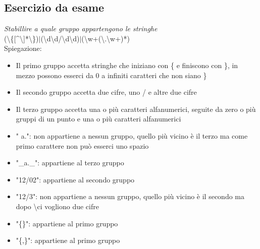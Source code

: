 \documentclass[12pt]{article}
\begin{document}
\subsection{Esercizio da esame}
\textit{Stabillire a quale gruppo appartengono le stringhe}\\
(\textbackslash \{[\textasciicircum\textbackslash]*\textbackslash\})$|$(\textbackslash d\textbackslash d/\textbackslash d\textbackslash d)$|$(\textbackslash w+(\textbackslash.\textbackslash w+)*)\\
Spiegazione:
\begin{itemize}
    \item Il primo gruppo accetta stringhe che iniziano con \{ e finiscono con \}, in mezzo possono esserci da 0 a infiniti caratteri che non siano \}
    \item Il secondo gruppo accetta due cifre, uno / e altre due cifre
    \item Il terzo gruppo accetta una o più caratteri alfanumerici, seguite da zero o più gruppi di un punto e una o più caratteri alfanumerici
\end{itemize}
\begin{itemize}
    \item " a.": non appartiene a nessun gruppo, quello più vicino è il terzo ma come primo carattere non può esserci uno spazio
    \item "\_a.\_": appartiene al terzo gruppo
    \item "12/02": appartiene al secondo gruppo
    \item "12/3": non appartiene a nessun gruppo, quello più vicino è il secondo ma dopo \textbackslash ci vogliono due cifre
    \item "\{\}": appartiene al primo gruppo
    \item "\{,\}": appartiene al primo gruppo
\end{itemize}
\end{document}
